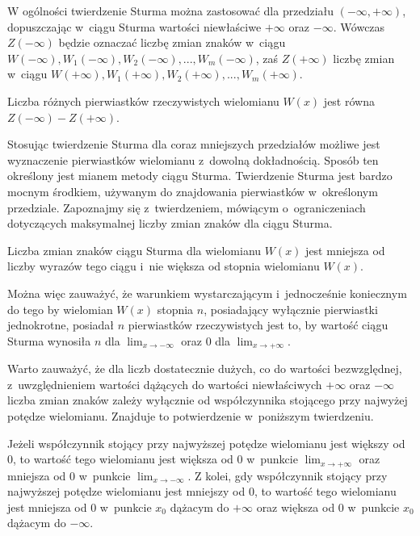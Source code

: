 W ogólności twierdzenie Sturma można zastosować dla przedziału $(-\infty,+\infty)$, dopuszczając w~ciągu Sturma wartości niewłaściwe $+\infty$ oraz $-\infty$. Wówczas $Z(-\infty)$ będzie oznaczać liczbę zmian znaków w~ciągu $W(-\infty), W_1(-\infty), W_2(-\infty),..., W_m(-\infty)$, zaś $Z(+\infty)$ liczbę zmian w~ciągu $W(+\infty), W_1(+\infty), W_2(+\infty),..., W_m(+\infty)$.

\begin{theorem}
	$ $ \\
	Liczba różnych pierwiastków rzeczywistych wielomianu $W(x)$ jest równa $Z(-\infty)-Z(+\infty)$.
\end{theorem}

Stosując twierdzenie Sturma dla coraz mniejszych przedziałów możliwe jest wyznaczenie pierwiastków wielomianu z~dowolną dokładnością. Sposób ten określony jest mianem metody ciągu Sturma.
Twierdzenie Sturma jest bardzo mocnym środkiem, używanym do znajdowania pierwiastków w~określonym przedziale. Zapoznajmy się z~twierdzeniem, mówiącym o~ograniczeniach dotyczących maksymalnej liczby zmian znaków dla ciągu Sturma.

\begin{theorem}
	$ $ \\
	Liczba zmian znaków ciągu Sturma dla wielomianu $W(x)$ jest mniejsza od liczby wyrazów tego ciągu i~nie większa od stopnia wielomianu $W(x)$.
\end{theorem}

Można więc zauważyć, że warunkiem wystarczającym i~jednocześnie koniecznym do tego by wielomian $W(x)$ stopnia $n$, posiadający wyłącznie pierwiastki jednokrotne, posiadał $n$ pierwiastków rzeczywistych jest to, by wartość ciągu Sturma wynosiła $n$ dla $\lim_{x \to -\infty}$ oraz $0$ dla $\lim_{x \to +\infty}$. 

Warto zauważyć, że dla liczb dostatecznie dużych, co do wartości bezwzględnej, z~uwzględnieniem wartości dążących do wartości niewłaściwych $+\infty$ oraz $-\infty$ liczba zmian znaków zależy wyłącznie od współczynnika stojącego przy najwyżej potędze wielomianu. Znajduje to potwierdzenie w~poniższym twierdzeniu.

\begin{theorem}
	$ $ \\
	Jeżeli współczynnik stojący przy najwyższej potędze wielomianu jest większy od $0$, to wartość tego wielomianu jest większa od $0$ w~punkcie $\lim_{x \to +\infty}$ oraz mniejsza od $0$ w~punkcie $\lim_{x \to -\infty}$.
	Z kolei, gdy współczynnik stojący przy najwyższej potędze wielomianu jest mniejszy od $0$, to wartość tego wielomianu jest mniejsza od $0$ w~punkcie $x_0$ dążacym do $+\infty$ oraz większa od $0$ w~punkcie $x_0$ dążacym do $-\infty$.
\end{theorem}

